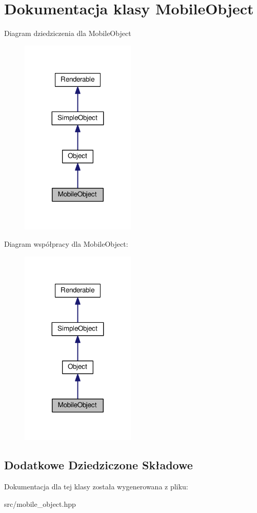 \hypertarget{class_mobile_object}{}\section{Dokumentacja klasy Mobile\+Object}
\label{class_mobile_object}


Diagram dziedziczenia dla Mobile\+Object
\nopagebreak
\begin{figure}[H]
\begin{center}
\leavevmode
\includegraphics[width=155pt]{class_mobile_object__inherit__graph}
\end{center}
\end{figure}


Diagram współpracy dla Mobile\+Object\+:
\nopagebreak
\begin{figure}[H]
\begin{center}
\leavevmode
\includegraphics[width=155pt]{class_mobile_object__coll__graph}
\end{center}
\end{figure}
\subsection*{Dodatkowe Dziedziczone Składowe}


Dokumentacja dla tej klasy została wygenerowana z pliku\+:\begin{DoxyCompactItemize}
\item 
src/mobile\+\_\+object.\+hpp\end{DoxyCompactItemize}
